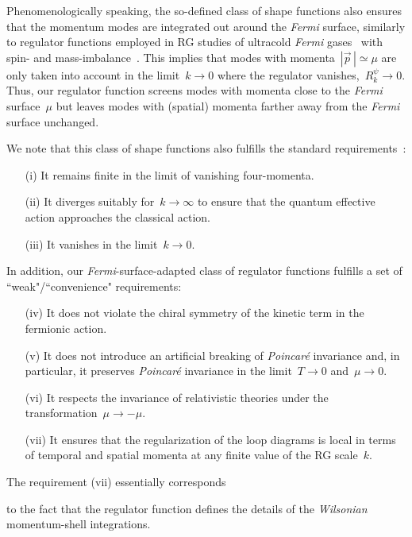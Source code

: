 \documentclass[prd,english,preprintnumbers,amsmath,amssymb,nofootinbib,twocolumn,superscriptaddress]{revtex4-1}
\begin{document}
{{Phenomenologically speaking, 
the so-defined class of shape functions also ensures that the momentum modes are integrated out around the {\it Fermi} surface,
similarly to regulator functions employed in RG studies of ultracold {\it Fermi} 
gases~\cite{Diehl:2007th} with spin- and mass-imbalance~\cite{Boettcher:2014tfa,Roscher:2015xha}.
This implies that modes with momenta~$|\vec{p}^{\,}|\simeq \mu$ are only taken into account in the limit~$k\to 0$ where
the regulator vanishes,~$R_k^{\psi}\to 0$. Thus, our regulator function screens 
modes with momenta close to the {\it Fermi} surface~$\mu$ but leaves modes with (spatial) 
momenta farther away from the {\it Fermi} surface unchanged. 
{We note that this class of shape functions also fulfills the standard requirements~\cite{Wetterich:1992yh}: 
%
\begin{itemize}
\item[(i)]
It remains finite in the limit of vanishing four-momenta.
\item[(ii)] 
It diverges suitably for~$k \to \infty$
to ensure that the quantum effective action approaches the classical action.
\item[(iii)]
It vanishes in the limit~$k\to 0$. 
\end{itemize}
%
In addition, our {\it Fermi}-surface-adapted 
class of regulator functions fulfills a set
of ``weak"/``convenience" requirements: 
%
\begin{itemize}
\item[(iv)] It does not violate the chiral symmetry of the 
kinetic term in the fermionic action.
\item[(v)] It does not introduce an artificial breaking of {\it Poincar\'{e}} invariance and, in particular, it preserves {\it Poincar\'{e}} invariance
in the limit~$T\to 0$ and~$\mu\to 0$.
\item[(vi)] It respects the invariance of relativistic theories under the transformation~$\mu \to -\mu$. 
\item[(vii)] It ensures that the regularization of the loop diagrams is local in terms of
temporal and spatial momenta at any finite value of the RG scale~$k$.
\end{itemize}
%
The requirement (vii) essentially corresponds}
to the fact that the regulator function defines the details of the {\it Wilsonian} momentum-shell integrations. 

}}
\end{document}

